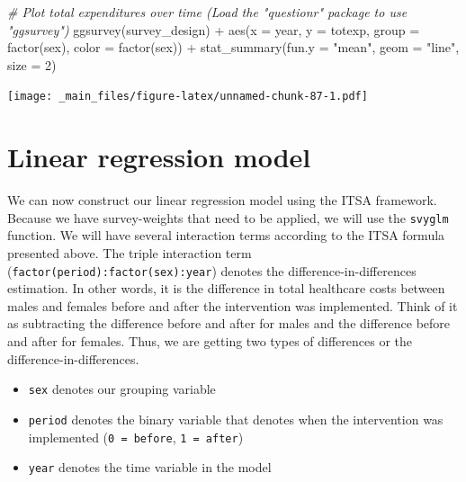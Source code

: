 \documentclass[
]{book}
\newenvironment{Shaded}{\begin{snugshade}}{\end{snugshade}}
\newcommand{\AttributeTok}[1]{\textcolor[rgb]{0.77,0.63,0.00}{#1}}
\newcommand{\CommentTok}[1]{\textcolor[rgb]{0.56,0.35,0.01}{\textit{#1}}}
\newcommand{\DecValTok}[1]{\textcolor[rgb]{0.00,0.00,0.81}{#1}}
\newcommand{\FunctionTok}[1]{\textcolor[rgb]{0.00,0.00,0.00}{#1}}
\newcommand{\NormalTok}[1]{#1}
\newcommand{\SpecialCharTok}[1]{\textcolor[rgb]{0.00,0.00,0.00}{#1}}
\newcommand{\StringTok}[1]{\textcolor[rgb]{0.31,0.60,0.02}{#1}}
\begin{document}
\begin{Shaded}
\begin{Highlighting}[]
\CommentTok{\# Plot total expenditures over time (Load the "questionr" package to use "ggsurvey")}
\FunctionTok{ggsurvey}\NormalTok{(survey\_design) }\SpecialCharTok{+}
  \FunctionTok{aes}\NormalTok{(}\AttributeTok{x =}\NormalTok{ year, }\AttributeTok{y =}\NormalTok{ totexp, }\AttributeTok{group =} \FunctionTok{factor}\NormalTok{(sex), }\AttributeTok{color =} \FunctionTok{factor}\NormalTok{(sex)) }\SpecialCharTok{+}
  \FunctionTok{stat\_summary}\NormalTok{(}\AttributeTok{fun.y =} \StringTok{"mean"}\NormalTok{, }\AttributeTok{geom =} \StringTok{"line"}\NormalTok{, }\AttributeTok{size =} \DecValTok{2}\NormalTok{)}
\end{Highlighting}
\end{Shaded}

\texttt{[image: \_main\_files/figure-latex/unnamed-chunk-87-1.pdf]}

\hypertarget{linear-regression-model}{%
\section{Linear regression model}\label{linear-regression-model}}

We can now construct our linear regression model using the ITSA framework. Because we have survey-weights that need to be applied, we will use the \texttt{svyglm} function. We will have several interaction terms according to the ITSA formula presented above. The triple interaction term (\texttt{factor(period):factor(sex):year}) denotes the difference-in-differences estimation. In other words, it is the difference in total healthcare costs between males and females before and after the intervention was implemented. Think of it as subtracting the difference before and after for males and the difference before and after for females. Thus, we are getting two types of differences or the difference-in-differences.

\begin{itemize}
\item
  \texttt{sex} denotes our grouping variable
\item
  \texttt{period} denotes the binary variable that denotes when the intervention was implemented (\texttt{0\ =\ before}, \texttt{1\ =\ after})
\item
  \texttt{year} denotes the time variable in the model
\end{itemize}
\end{document}
